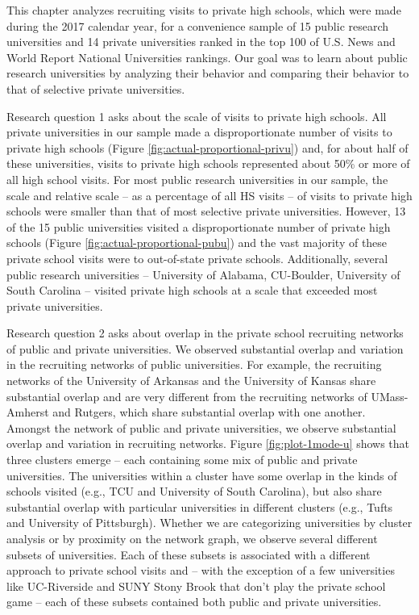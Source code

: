 \documentclass[
  12pt,
]{article}
\begin{document}
This chapter analyzes recruiting visits to private high schools, which were made during the 2017 calendar year, for a convenience sample of 15 public research universities and 14 private universities ranked in the top 100 of U.S. News and World Report National Universities rankings. Our goal was to learn about public research universities by analyzing their behavior and comparing their behavior to that of selective private universities.

Research question 1 asks about the scale of visits to private high schools. All private universities in our sample made a disproportionate number of visits to private high schools (Figure \ref{fig:actual-proportional-privu}) and, for about half of these universities, visits to private high schools represented about 50\% or more of all high school visits. For most public research universities in our sample, the scale and relative scale -- as a percentage of all HS visits -- of visits to private high schools were smaller than that of most selective private universities. However, 13 of the 15 public universities visited a disproportionate number of private high schools (Figure \ref{fig:actual-proportional-pubu}) and the vast majority of these private school visits were to out-of-state private schools. Additionally, several public research universities -- University of Alabama, CU-Boulder, University of South Carolina -- visited private high schools at a scale that exceeded most private universities.

Research question 2 asks about overlap in the private school recruiting networks of public and private universities. We observed substantial overlap and variation in the recruiting networks of public universities. For example, the recruiting networks of the University of Arkansas and the University of Kansas share substantial overlap and are very different from the recruiting networks of UMass-Amherst and Rutgers, which share substantial overlap with one another. Amongst the network of public and private universities, we observe substantial overlap and variation in recruiting networks. Figure \ref{fig:plot-1mode-u} shows that three clusters emerge -- each containing some mix of public and private universities. The universities within a cluster have some overlap in the kinds of schools visited (e.g., TCU and University of South Carolina), but also share substantial overlap with particular universities in different clusters (e.g., Tufts and University of Pittsburgh). Whether we are categorizing universities by cluster analysis or by proximity on the network graph, we observe several different subsets of universities. Each of these subsets is associated with a different approach to private school visits and -- with the exception of a few universities like UC-Riverside and SUNY Stony Brook that don't play the private school game -- each of these subsets contained both public and private universities.
\end{document}
